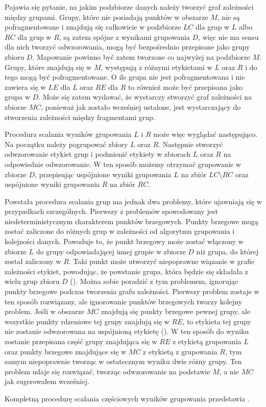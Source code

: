 Pojawia się pytanie, na jakim podzbiorze danych należy tworzyć graf zależności między grupami. Grupy, które nie posiadają punktów w obszarze $ M $, nie są pofragmentowane i znajdują się całkowicie w podzbiorze $ LC $ dla grup w $ L $ albo $ RC $ dla grup w $ R $, są zatem spójne z wynikami grupowania $ D $, więc nie ma sensu dla nich tworzyć odwzorowania, mogą być bezpośrednio przepisane jako grupy zbioru $ D $. Mapowanie powinno być zatem tworzone co najwyżej na podzbiorze $ M $. Grupy, które znajdują się w $ M $, występują z różnymi etykietami w $ L $ oraz $ R $ i do tego mogą być pofragmentowane. O ile grupa nie jest pofragmentowana i nie zawiera się w $ LE $ dla $ L $ oraz $ RE $ dla $ R $ to również może być przepisana jako grupa w $ D $. Może się zatem wydawać, że wystarczy stworzyć graf zależności na zbiorze $ MC $, ponieważ jak zostało wcześniej ustalone, jest wystarczający do stworzenia zależności między fragmentami grup.\par
Procedura scalania wyników grupowania $ L $ i $ R $ może więc wyglądać następująco. Na początku należy pogrupować zbiory $ L $ oraz $ R $. Następnie stworzyć odwzorowanie etykiet grup i podmienić etykiety w zbiorach $ L $ oraz $ R $ na odpowiednie odwzorowanie. W ten sposób możemy otrzymać grupowanie w zbiorze $ D $, przepisując uspójnione wyniki grupowania $ L $ na zbiór $ LC \setminus RC $ oraz uspójnione wyniki grupowania $ R $ na zbiór $ RC $.\par

Powstała procedura scalania grup ma jednak dwa problemy, które ujawniają się w przypadkach szczególnych. Pierwszy z problemów spowodowany jest niedeterministycznym charakterem punktów brzegowych. Punkty brzegowe mogą zostać zaliczone do różnych grup w zależności od algorytmu grupowania i kolejności danych. Powoduje to, że punkt brzegowy może zostać włączony w zbiorze $ L $ do grupy odpowiadającej innej grupie w zbiorze $ D $ niż grupa, do której został zaliczony w $ R $. Taki punkt może utworzyć niepoprawne wiązanie w grafie zależności etykiet, powodując, że powstanie grupa, która będzie się składała z wielu grup zbioru $ D $ (). Można sobie poradzić z tym problemem, ignorując punkty brzegowe podczas tworzenia grafu zależności. Pierwszy problem zostaje w ten sposób rozwiązany, ale ignorowanie punktów brzegowych tworzy kolejny problem. Jeśli w obszarze $ MC $ znajdują się punkty brzegowe pewnej grupy, ale wszystkie punkty rdzeniowe tej grupy znajdują się w $ RE $, to etykieta tej grupy nie zostanie odwzorowana na uspójnioną etykietę (). W ten sposób do wyniku zostanie przepisana część grupy znajdująca się w $ RE $ z etykietą grupowania $ L $ oraz punkty brzegowe znajdujące się w $ MC $ z etykietą z grupowania $ R $, tym samym niepoprawnie tworząc w ostatecznym wyniku dwie różny grupy. Ten problem udaje się rozwiązać, tworząc odwzorowanie na podstawie $ M $, a nie $ MC $ jak sugerowałem wcześniej.\par


Kompletną procedurę scalania częściowych wyników grupowania przedstawia .

